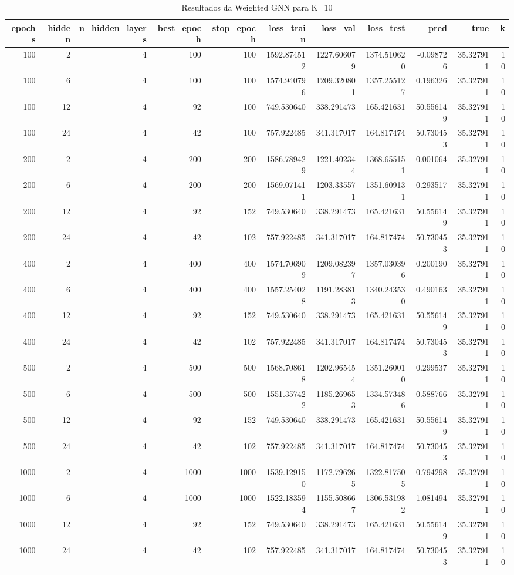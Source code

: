 \begin{table}
\caption{Resultados da Weighted GNN para K=10}
\label{tab:weighted_gnn_results_k10}
\begin{tabular}{rrrrrrrrrrr}
\toprule
epochs & hidden & n\_hidden\_layers & best\_epoch & stop\_epoch & loss\_train & loss\_val & loss\_test & pred & true & k \\
\midrule
100 & 2 & 4 & 100 & 100 & 1592.874512 & 1227.606079 & 1374.510620 & -0.098726 & 35.327911 & 10 \\
100 & 6 & 4 & 100 & 100 & 1574.940796 & 1209.320801 & 1357.255127 & 0.196326 & 35.327911 & 10 \\
100 & 12 & 4 & 92 & 100 & 749.530640 & 338.291473 & 165.421631 & 50.556149 & 35.327911 & 10 \\
100 & 24 & 4 & 42 & 100 & 757.922485 & 341.317017 & 164.817474 & 50.730453 & 35.327911 & 10 \\
200 & 2 & 4 & 200 & 200 & 1586.789429 & 1221.402344 & 1368.655151 & 0.001064 & 35.327911 & 10 \\
200 & 6 & 4 & 200 & 200 & 1569.071411 & 1203.335571 & 1351.609131 & 0.293517 & 35.327911 & 10 \\
200 & 12 & 4 & 92 & 152 & 749.530640 & 338.291473 & 165.421631 & 50.556149 & 35.327911 & 10 \\
200 & 24 & 4 & 42 & 102 & 757.922485 & 341.317017 & 164.817474 & 50.730453 & 35.327911 & 10 \\
400 & 2 & 4 & 400 & 400 & 1574.706909 & 1209.082397 & 1357.030396 & 0.200190 & 35.327911 & 10 \\
400 & 6 & 4 & 400 & 400 & 1557.254028 & 1191.283813 & 1340.243530 & 0.490163 & 35.327911 & 10 \\
400 & 12 & 4 & 92 & 152 & 749.530640 & 338.291473 & 165.421631 & 50.556149 & 35.327911 & 10 \\
400 & 24 & 4 & 42 & 102 & 757.922485 & 341.317017 & 164.817474 & 50.730453 & 35.327911 & 10 \\
500 & 2 & 4 & 500 & 500 & 1568.708618 & 1202.965454 & 1351.260010 & 0.299537 & 35.327911 & 10 \\
500 & 6 & 4 & 500 & 500 & 1551.357422 & 1185.269653 & 1334.573486 & 0.588766 & 35.327911 & 10 \\
500 & 12 & 4 & 92 & 152 & 749.530640 & 338.291473 & 165.421631 & 50.556149 & 35.327911 & 10 \\
500 & 24 & 4 & 42 & 102 & 757.922485 & 341.317017 & 164.817474 & 50.730453 & 35.327911 & 10 \\
1000 & 2 & 4 & 1000 & 1000 & 1539.129150 & 1172.796265 & 1322.817505 & 0.794298 & 35.327911 & 10 \\
1000 & 6 & 4 & 1000 & 1000 & 1522.183594 & 1155.508667 & 1306.531982 & 1.081494 & 35.327911 & 10 \\
1000 & 12 & 4 & 92 & 152 & 749.530640 & 338.291473 & 165.421631 & 50.556149 & 35.327911 & 10 \\
1000 & 24 & 4 & 42 & 102 & 757.922485 & 341.317017 & 164.817474 & 50.730453 & 35.327911 & 10 \\
\bottomrule
\end{tabular}
\end{table}
